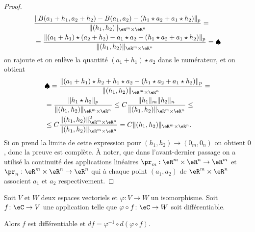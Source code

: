 \begin{proof}
	\begin{equation}
		\begin{aligned}
			 & \frac{\|B(a_1+h_1,a_2+h_2)-B(a_1,a_2)-(h_1\star a_2 + a_1\star h_2)\|_p}{\|(h_1,h_2)\|_{\eR^m\times\eR^n}} =                   \\
			 & = \frac{\|(a_1+h_1)\star(a_2+h_2)-a_1\star a_2-(h_1\star a_2 + a_1\star h_2)\|_p}{\|(h_1,h_2)\|_{\eR^m\times\eR^n}}=\spadesuit
		\end{aligned}
	\end{equation}
	on rajoute et on enlève la quantité $(a_1+h_1)\star a_2$ dans le numérateur, et on obtient
	\begin{equation}
		\begin{aligned}
			 & \spadesuit= \frac{\|(a_1+h_1)\star h_2+h_1\star a_2-(h_1\star a_2 + a_1\star h_2)\|_p}{\|(h_1,h_2)\|_{\eR^m\times\eR^n}}=          \\
			 & = \frac{\|h_1\star h_2\|_p}{\|(h_1,h_2)\|_{\eR^m\times\eR^n}}\leq C\frac{\|h_1\|_m\|h_2\|_n}{\|(h_1,h_2)\|_{\eR^m\times\eR^n}}\leq \\
			 & \leq C\frac{\|(h_1,h_2)\|^2_{\eR^m\times\eR^n}}{\|(h_1,h_2)\|_{\eR^m\times\eR^n}}= C\|(h_1,h_2)\|_{\eR^m\times\eR^n}.
		\end{aligned}
	\end{equation}
	Si on prend la limite de cette expression pour $(h_1,h_2)\to (0_m,0_n)$ on obtient $0$, donc la preuve est complète. À noter, que dans l'avant-dernier passage on a utilisé la continuité des applications linéaires $\pr_m:\eR^m\times\eR^n\to \eR^m$ et $\pr_n: \eR^m\times\eR^n\to \eR^n$ qui à chaque point $(a_1,a_2)$ de $\eR^m\times\eR^n$ associent $a_1$ et $a_2$ respectivement.
\end{proof}

\begin{proposition}     \label{PropEKLTooSvZjdW}
	Soit \( V\) et \( W\) deux espaces vectoriels et \( \varphi\colon V\to W\) un isomorphisme. Soit \( f\colon \eC\to V\) une application telle que \(\varphi\circ f\colon \eC\to W\) soit différentiable.

	Alors \( f\) est différentiable et \( df=\varphi^{-1}\circ d(\varphi\circ f)\).
\end{proposition}


